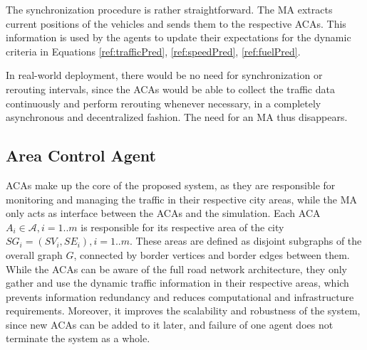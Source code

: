 \documentclass[sigconf]{aamas}
\begin{document}
The synchronization procedure is rather straightforward. The MA extracts current positions of the vehicles and sends them to the respective ACAs. This information is used by the agents to update their expectations for the dynamic criteria in Equations \ref{ref:trafficPred}, \ref{ref:speedPred}, \ref{ref:fuelPred}.

In real-world deployment, there would be no need for synchronization or rerouting intervals, since the ACAs would be able to collect the traffic data continuously and perform rerouting whenever necessary, in a completely asynchronous and decentralized fashion. The need for an MA thus disappears. 

\subsection{Area Control Agent}
ACAs make up the core of the proposed system, as they are responsible for monitoring and managing the traffic in their respective city areas, while the MA only acts as interface between the ACAs and the simulation. Each ACA $A_i \in \mathcal{A}, i=1..m$ is responsible for its respective area of the city $SG_i = (SV_i, SE_i), i=1..m$. These areas are defined as disjoint subgraphs of the overall graph $G$, connected by border vertices and border edges between them. While the ACAs can be aware of the full road network architecture, they only gather and use the dynamic traffic information in their respective areas, which prevents information redundancy and reduces computational and infrastructure requirements. Moreover, it improves the scalability and robustness of the system, since new ACAs can be added to it later, and failure of one agent does not terminate the system as a whole.
\end{document}
